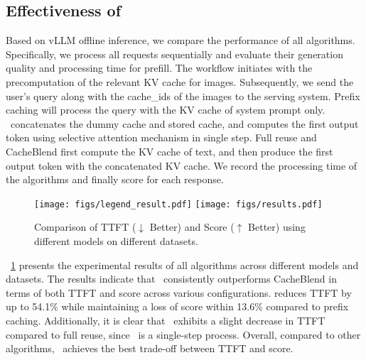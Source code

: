\subsection{Effectiveness of \sys}
Based on vLLM offline inference, we compare the performance of all algorithms. Specifically, we process all requests sequentially and evaluate their generation quality and processing time for prefill. The workflow initiates with the precomputation of the relevant KV cache for images. Subsequently, we send the user's query along with the cache\_ids of the images to the serving system. Prefix caching will process the query with the KV cache of system prompt only. \sys~concatenates the dummy cache and stored cache, and computes the first output token using selective attention mechanism in single step. Full reuse and CacheBlend first compute the KV cache of text, and then produce the first output token with the concatenated KV cache. We record the processing time of the algorithms and finally score for each response.
\begin{figure}[t]
    \centering
    \texttt{[image: figs/legend\_result.pdf]}
    \texttt{[image: figs/results.pdf]}
    \caption{Comparison of TTFT ($\downarrow$ Better) and Score ($\uparrow$ Better) using different models on different datasets. }
    \label{fig:ttft-score}
\end{figure}

\figurename~\ref{fig:ttft-score} presents the experimental results of all algorithms across different models and datasets. The results indicate that \sys~consistently outperforms CacheBlend in terms of both TTFT and score across various configurations.  reduces TTFT by up to 54.1\% while maintaining a loss of score within 13.6\% compared to prefix caching. Additionally, it is clear that \sys~exhibits a slight decrease in TTFT compared to full reuse, since \sys~is a single-step process. Overall, compared to other algorithms, \sys~achieves the best trade-off between TTFT and score.

